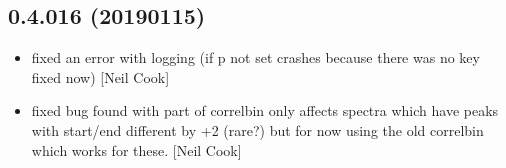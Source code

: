 \documentclass[a4paper,10pt,english]{report}
\begin{document}
\subsection{0.4.016 (2019\sphinxhyphen{}01\sphinxhyphen{}15)}
\label{\detokenize{misc/changelog:id237}}\begin{itemize}
\item {} 
 \sphinxhyphen{} fixed an error with logging (if p not set crashes
because there was no  key \textendash{} fixed now) {[}Neil Cook{]}

\item {} 
 \sphinxhyphen{} fixed bug found with part of correlbin \sphinxhyphen{} only affects
spectra which have peaks with start/end different by +2 (rare?) but
for now using the old correlbin which works for these. {[}Neil Cook{]}

\end{itemize}
\end{document}
